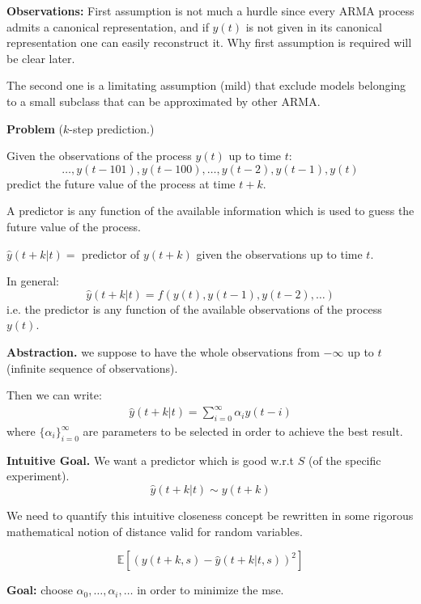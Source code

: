 \textbf{Observations:}
First assumption is not much a hurdle since every ARMA process admits a canonical representation, and if $y(t)$ is not given in its canonical representation one can easily reconstruct it. Why first assumption is required will be clear later. 

The second one is a limitating assumption (mild) that exclude models belonging to a small subclass that can be approximated by other ARMA.

\textbf{Problem} ($k$-step prediction.)

Given the observations of the process $y(t)$ up to time $t$:
$$
	\ldots , y(t-101), y(t-100), \ldots , y(t-2), y(t-1), y(t)
$$
predict the future value of the process at time $t + k$.


A predictor is any function of the available information which is used to guess the future value of the process.

$\hat{y}(t + k | t) =$ predictor of $y(t + k)$ given the observations up to time $t$.

In general: 
$$\hat{y}(t + k | t) = f ( y(t), y(t-1), y(t-2),\ldots)$$
i.e. the predictor is any function of the available observations of the process $y(t)$.

\textbf{Abstraction.} we suppose to have the whole observations from $-\infty$ up to $t$ (infinite sequence of observations).

Then we can write:
\begin{align*}
	\hat{y}(t + k | t)=\sum_{i=0}^{\infty}\alpha_i y(t-i)
\end{align*}
where ${\{\alpha_i\}}_{i=0}^\infty$ are parameters to be selected in order to achieve the best result.

\textbf{Intuitive Goal.} 
We want a predictor which is good w.r.t $S$ (of the specific experiment).
$$\hat{y}(t + k | t)\sim y(t+k) $$

We need to quantify this intuitive closeness concept be rewritten in some rigorous mathematical notion of distance valid for random variables.

\begin{definition}
	\[
		\mathbb{E}[(y(t+k,s)-\hat{y}(t+k|t,s))^2]
	\]
\end{definition}

\textbf{Goal:} choose $\alpha_0,\ldots,\alpha_i,\ldots$ in order to minimize the \gls{mse}.